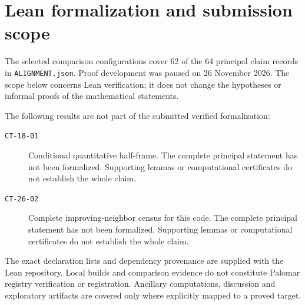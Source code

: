 \section*{Lean formalization and submission scope}
The selected comparison configurations cover 62 of the 64 principal claim records in \texttt{ALIGNMENT.json}. Proof development was paused on 26 November 2026. The scope below concerns Lean verification; it does not change the hypotheses or informal proofs of the mathematical statements.

The following results are not part of the submitted verified formalization:
\begin{description}
\item[\texttt{CT-18-01}] Conditional quantitative half-frame. The complete principal statement has not been formalized. Supporting lemmas or computational certificates do not establish the whole claim.
\item[\texttt{CT-26-02}] Complete improving-neighbor census for this code. The complete principal statement has not been formalized. Supporting lemmas or computational certificates do not establish the whole claim.
\end{description}

The exact declaration lists and dependency provenance are supplied with the Lean repository. Local builds and comparison evidence do not constitute Palomar registry verification or registration. Ancillary computations, discussion and exploratory artifacts are covered only where explicitly mapped to a proved target.
